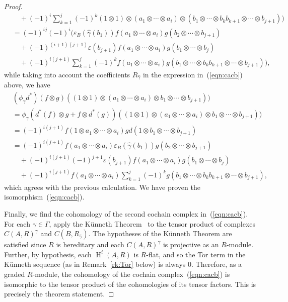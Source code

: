 \documentclass[11pt]{amsart}
\numberwithin{equation}{section}
\theoremstyle{definition}
\theoremstyle{remark}
\newcommand{\g}{\gamma}
\newcommand{\hg}{\widehat{\g}}
\newcommand\Homol{\operatorname{H}}
\newcommand\coh{\Homol}
\newcommand\ot{\otimes}
\begin{document}
\begin{proof}
\[\begin{aligned}
      & \quad + (-1)^i \sum_{k=1}^j (-1)^k (1\ot 1)\ot (a_1\ot\cdots \ot a_i)
      \ot (b_1\ot\cdots\ot b_kb_{k+1}\ot\cdots\ot b_{j+1})\big) \\
      & = (-1)^{ij}(-1)^i \big(\varepsilon_B(\hg(b_1))
      f(a_1\ot\cdots\ot a_i)g(b_2\ot\cdots
      \ot b_{j+1}) \\
      & \quad + (-1)^{(i+1)(j+1)} \varepsilon(b_{j+1}) f(a_1\ot\cdots\ot a_i)
       g(b_1\ot\cdots \ot b_j) \\
      & \quad   + (-1)^{i(j+1)} \sum_{k=1}^j (-1)^k  
           f(a_1\ot\cdots\ot a_i) g(b_1\ot\cdots\ot
          b_kb_{k+1}\ot \cdots \ot b_{j+1} )\big) , 
      \end{aligned}
    \]
while taking into account the coefficients $R_{\widehat{\g}}$ in the expression
in~(\ref{eqn:cacb}) above, we have
      \[
      \begin{aligned}
        & (\phi_{\g} d^*) (f\ot g) ( (1\ot 1)\ot (a_1\ot\cdots\ot a_i)\ot
        b_1\ot\cdots\ot b_{j+1}))\\
        & = \phi_{\g}(d^*(f) \ot g +  f\ot d^*(g))
            ( (1\ot 1)\ot (a_1\ot\cdots\ot a_i)\ot
        b_1\ot\cdots\ot b_{j+1}))\\
        & = 
      (-1)^{i(j+1)} f(1\ot a_1\ot\cdots\ot a_{i})
        gd(1\ot b_1\ot\cdots\ot b_{j+1})\\
        & = (-1)^{i(j+1)}  f(a_1\ot\cdots\ot a_i)
        \varepsilon_B(\hg(b_1)) g(b_2\ot\cdots\ot b_{j+1}) \\
        & \quad + (-1)^{i(j+1)}(-1)^{j+1} \varepsilon(b_{j+1})
           f(a_1\ot\cdots\ot a_i)g(b_1\ot\cdots\ot b_j)\\
        & \quad + (-1)^{i(j+1)}  f( a_1\ot\cdots\ot a_i)
        \sum_{k=1}^{j} (-1)^k g(b_1\ot\cdots\ot b_kb_{k+1}
        \ot \cdots\ot b_{j+1}) , 
            \end{aligned}
      \]
      which agrees with the previous calculation.
We have proven the isomorphism~(\ref{eqn:cacb}). 

      Finally, we find the cohomology of the
      second cochain complex in~(\ref{eqn:cacb}).
      For each $\g\in\Gamma$,
      apply the K\"unneth Theorem~\cite[Theorem 3.6.3]{Weibel}  
to the tensor product of complexes
      $C(A,R)^{\g}$ and $C(B,R_{\hg})$.
      The hypotheses of the K\"unneth Theorem are satisfied since
      $R$ is hereditary and each
      $C(A,R)^{\g}$ is projective as an $R$-module. 
    Further, by hypothesis, each $\coh^i(A,R)$ is $R$-flat, 
and so the Tor term in the K\"unneth sequence 
(as in Remark~\ref{rk:Tor} below)
    is always 0.
    Therefore, as a graded $R$-module,  
the cohomology of the cochain complex~(\ref{eqn:cacb})
    is isomorphic to the tensor product of the cohomologies of its
    tensor factors.
    This is precisely the theorem statement.
\end{proof}
\end{document}
